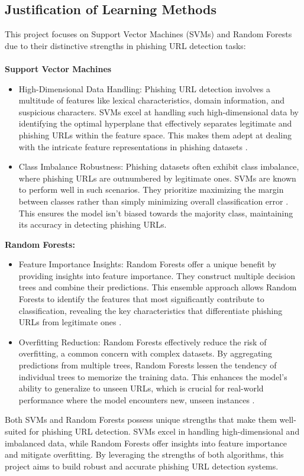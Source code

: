 \documentclass[11pt]{article}
\begin{document}
\subsection{Justification of Learning Methods}

This project focuses on Support Vector Machines (SVMs) and Random Forests due to their distinctive strengths in phishing URL detection tasks:\\\\ \textbf{Support Vector Machines} 
\begin{itemize}
\item High-Dimensional Data Handling: Phishing URL detection involves a multitude of features like lexical characteristics, domain information, and suspicious characters. SVMs excel at handling such high-dimensional data by identifying the optimal hyperplane that effectively separates legitimate and phishing URLs within the feature space. This makes them adept at dealing with the intricate feature representations in phishing datasets \cite{aljofey2022effective}.

\item Class Imbalance Robustness: Phishing datasets often exhibit class imbalance, where phishing URLs are outnumbered by legitimate ones. SVMs are known to perform well in such scenarios. They prioritize maximizing the margin between classes rather than simply minimizing overall classification error \cite{sahingoz2019}. This ensures the model isn't biased towards the majority class, maintaining its accuracy in detecting phishing URLs.
\end{itemize} \textbf{Random Forests:}

\begin{itemize}
\item Feature Importance Insights: Random Forests offer a unique benefit by providing insights into feature importance. They construct multiple decision trees and combine their predictions. This ensemble approach allows Random Forests to identify the features that most significantly contribute to classification, revealing the key characteristics that differentiate phishing URLs from legitimate ones \cite{li2023survey}.

\item Overfitting Reduction: Random Forests effectively reduce the risk of overfitting, a common concern with complex datasets. By aggregating predictions from multiple trees, Random Forests lessen the tendency of individual trees to memorize the training data. This enhances the model's ability to generalize to unseen URLs, which is crucial for real-world performance where the model encounters new, unseen instances \cite{xiao2020cost_sensitive_random_forests}.
\end{itemize} Both SVMs and Random Forests possess unique strengths that make them well-suited for phishing URL detection. SVMs excel in handling high-dimensional and imbalanced data, while Random Forests offer insights into feature importance and mitigate overfitting. By leveraging the strengths of both algorithms, this project aims to build robust and accurate phishing URL detection systems.
\end{document}
